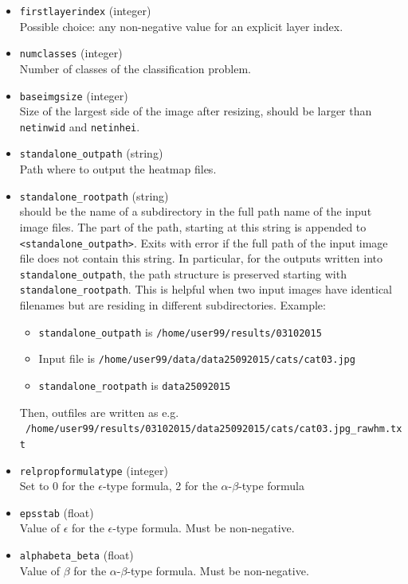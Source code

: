 \documentclass[a4wide]{article}
\begin{document}
\begin{itemize}
 \item \texttt{firstlayerindex} (integer) \\
Possible choice: any non-negative value for an explicit layer index.

\item \texttt{numclasses} (integer) \\
Number of classes of the classification problem.

\item \texttt{baseimgsize} (integer)  \\
Size of the largest side of the image after resizing, should be larger than \texttt{netinwid} and \texttt{netinhei}.

\item \texttt{standalone\_outpath} (string) \\
Path where to output the heatmap files.

\item \texttt{standalone\_rootpath}  (string) \\
should be the name of a subdirectory in the full path name of the input image files. The part of the path, starting at this string is appended to \texttt{<standalone\_outpath>}. Exits with error if the full path of the input image file does not contain this string. In particular, for the outputs written into \texttt{standalone\_outpath}, the path structure is preserved starting with \texttt{standalone\_rootpath}. This is helpful when two input images have identical filenames but are residing in different subdirectories. Example: 
\begin{itemize}
\item \texttt{standalone\_outpath} is \texttt{/home/user99/results/03102015}
\item Input file is \texttt{/home/user99/data/data25092015/cats/cat03.jpg}
\item \texttt{standalone\_rootpath} is \texttt{data25092015}
\end{itemize}
Then, outfiles are written as e.g. \texttt{~/home/user99/results/03102015/data25092015/cats/cat03.jpg\_rawhm.txt}


\item \texttt{relpropformulatype} (integer) \\
Set to 0 for the $\epsilon$-type formula, 2 for the $\alpha$-$\beta$-type formula

\item \texttt{epsstab} (float) \\
Value of $\epsilon$ for the $\epsilon$-type formula. Must be non-negative.

\item \texttt{alphabeta\_beta} (float) \\
Value of $\beta$ for the $\alpha$-$\beta$-type formula. Must be non-negative.
	

\end{itemize}
\end{document}
